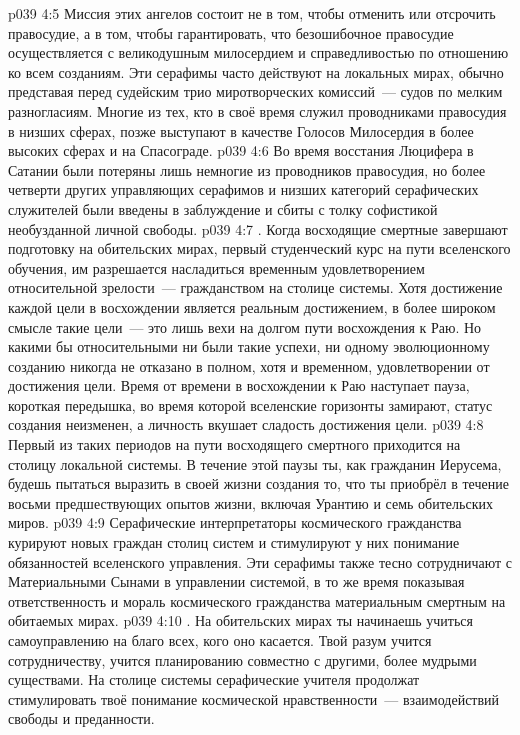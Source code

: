 \vs p039 4:5 Миссия этих ангелов состоит не в том, чтобы отменить или отсрочить правосудие, а в том, чтобы гарантировать, что безошибочное правосудие осуществляется с великодушным милосердием и справедливостью по отношению ко всем созданиям. Эти серафимы часто действуют на локальных мирах, обычно представая перед судейским трио миротворческих комиссий~--- судов по мелким разногласиям. Многие из тех, кто в своё время служил проводниками правосудия в низших сферах, позже выступают в качестве Голосов Милосердия в более высоких сферах и на Спасограде.
\vs p039 4:6 Во время восстания Люцифера в Сатании были потеряны лишь немногие из проводников правосудия, но более четверти других управляющих серафимов и низших категорий серафических служителей были введены в заблуждение и сбиты с толку софистикой необузданной личной свободы.
\vs p039 4:7 . Когда восходящие смертные завершают подготовку на обительских мирах, первый студенческий курс на пути вселенского обучения, им разрешается насладиться временным удовлетворением относительной зрелости~--- гражданством на столице системы. Хотя достижение каждой цели в восхождении является реальным достижением, в более широком смысле такие цели~--- это лишь вехи на долгом пути восхождения к Раю. Но какими бы относительными ни были такие успехи, ни одному эволюционному созданию никогда не отказано в полном, хотя и временном, удовлетворении от достижения цели. Время от времени в восхождении к Раю наступает пауза, короткая передышка, во время которой вселенские горизонты замирают, статус создания неизменен, а личность вкушает сладость достижения цели.
\vs p039 4:8 Первый из таких периодов на пути восходящего смертного приходится на столицу локальной системы. В течение этой паузы ты, как гражданин Иерусема, будешь пытаться выразить в своей жизни создания то, что ты приобрёл в течение восьми предшествующих опытов жизни, включая Урантию и семь обительских миров.
\vs p039 4:9 Серафические интерпретаторы космического гражданства курируют новых граждан столиц систем и стимулируют у них понимание обязанностей вселенского управления. Эти серафимы также тесно сотрудничают с Материальными Сынами в управлении системой, в то же время показывая ответственность и мораль космического гражданства материальным смертным на обитаемых мирах.
\vs p039 4:10 . На обительских мирах ты начинаешь учиться самоуправлению на благо всех, кого оно касается. Твой разум учится сотрудничеству, учится планированию совместно с другими, более мудрыми существами. На столице системы серафические учителя продолжат стимулировать твоё понимание космической нравственности~--- взаимодействий свободы и преданности.
